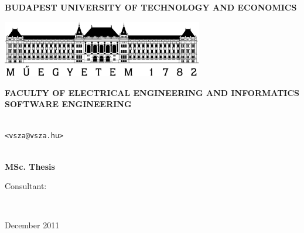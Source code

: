 \begin{center}

\textbf{BUDAPEST UNIVERSITY OF TECHNOLOGY AND ECONOMICS}

\medskip

\includegraphics[width=8.79cm]{images/bme.pdf}

\medskip

\textbf{FACULTY OF ELECTRICAL ENGINEERING AND INFORMATICS\\SOFTWARE ENGINEERING}

 \vspace{2cm}
 \Large\textbf{\cim}

 \vspace{6mm}
 \textbf{\nev} \\
 \texttt{<vsza@vsza.hu>} \\ \strut \\

 \Large\textbf{MSc. Thesis}

\end{center}

\vfill

Consultant:

\begin{center}
\konzulens\\ \konzbeoszt

\vspace{96pt}

December 2011
\end{center}

